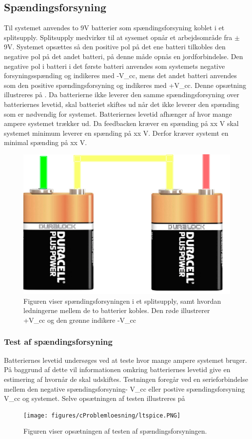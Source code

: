 \subsection{Spændingsforsyning}
Til systemet anvendes to 9V batterier som spændingsforsyning koblet i et splitsupply. Splitsupply medvirker til at sysemet opnår et arbejdsområde fra $\pm$ 9V. Systemet opsættes så den positive pol på det ene batteri tilkobles den negative pol på det andet batteri, på denne måde opnås en jordforbindelse. Den negative pol i batteri i det første batteri anvendes som systemets negative forsyningsspænding og indikeres med -V_cc, mens det andet batteri anvendes som den positive spændingsforsyning og indikeres med +V_cc. Denne opsætning illustreres på . 
Da batterierne ikke leverer den samme spændingsforsyning over batteriernes levetid, skal batteriet skiftes ud når det ikke leverer den spænding som er nødvendig for systemet. Batteriernes levetid afhænger af hvor mange ampere systemet trækker ud. Da feedbacken kræver en spænding på xx V skal systemet minimum leverer en spænding på xx V. Derfor kræver systemt en minimal spænding på xx V.

\begin{figure}[H]
\centering
\includegraphics[scale=1]{figures/cProblemloesning/batteri.PNG}
\caption{Figuren viser spændingsforsyningen i et splitsupply, samt hvordan ledningerne mellem de to batterier kobles. Den røde illustrerer +V_cc og den grønne indikere -V_cc}
\label{fig:batteri}
\end{figure}

\subsubsection{Test af spændingsforsyning}
Batteriernes levetid undersøges ved at teste hvor mange ampere systemet bruger. På baggrund af dette vil informationen omkring batteriernes levetid give en estimering af hvornår de skal udskiftes. Testningen foregår ved en serieforbindelse mellem den negative spændingsforsyning- V_cc eller postive spændingsforsyning V_cc og systemet. Selve opsætningen af testen illustreres på 

\begin{figure}[H]
\centering
\texttt{[image: figures/cProblemloesning/ltspice.PNG]}
\caption{Figuren viser opsætningen af testen af spændingsforsyningen.}
\label{fig:spændingsforsyning}
\end{figure}